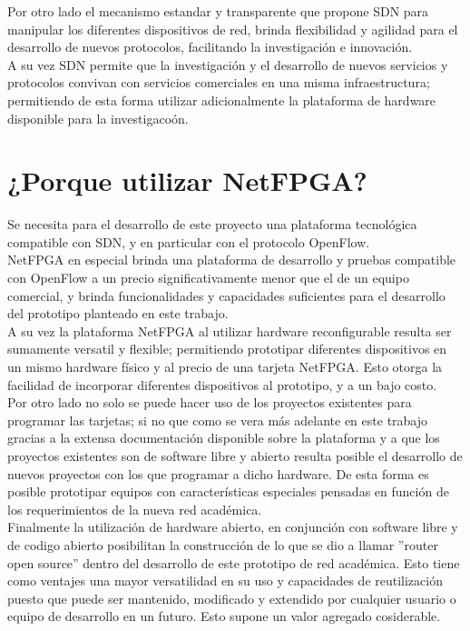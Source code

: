 Por otro lado el mecanismo estandar y transparente que propone SDN para manipular los diferentes dispositivos de red, brinda flexibilidad y agilidad para el desarrollo de nuevos protocolos, facilitando la investigaci\'on e innovaci\'on.\\

A su vez SDN permite que la investigaci\'on y el desarrollo de nuevos servicios y protocolos convivan con servicios comerciales en una misma infraestructura; permitiendo de esta forma utilizar adicionalmente la plataforma de hardware disponible para la investigaco\'on. 


\section[¿Porque utilizar NetFPGA?]{¿Porque utilizar NetFPGA?}

Se necesita para el desarrollo de este proyecto una plataforma tecnol\'ogica compatible con SDN, y en particular con el protocolo OpenFlow.\\
NetFPGA en especial brinda una plataforma de desarrollo y pruebas compatible con OpenFlow a un precio significativamente menor que el de un equipo comercial, y brinda funcionalidades y capacidades suficientes para el desarrollo del prototipo planteado en este trabajo.\\

A su vez la plataforma NetFPGA al utilizar hardware reconfigurable resulta ser sumamente versatil y flexible; permitiendo prototipar diferentes dispositivos en un mismo hardware f\'isico y al precio de una tarjeta NetFPGA. Esto otorga la facilidad de incorporar diferentes dispositivos al prototipo, y a un bajo costo.\\

Por otro lado no solo se puede hacer uso de los proyectos existentes para programar las tarjetas; si no que como se vera m\'as adelante en este trabajo gracias a la extensa documentaci\'on disponible sobre la plataforma y a que los proyectos existentes son de software libre y abierto resulta posible el desarrollo de nuevos proyectos con los que programar a dicho hardware. De esta forma es posible prototipar equipos con caracter\'isticas especiales pensadas en funci\'on de los requerimientos de la nueva red acad\'emica.\\

Finalmente la utilizaci\'on de hardware abierto, en conjunci\'on con software libre y de codigo abierto posibilitan la construcci\'on de lo que se dio a llamar ''router open source'' dentro del desarrollo de este prototipo de red acad\'emica. Esto tiene como ventajes una mayor versatilidad en su uso y capacidades de reutilizaci\'on puesto que puede ser mantenido, modificado y extendido por cualquier usuario o equipo de desarrollo en un futuro. Esto supone un valor agregado cosiderable. 


